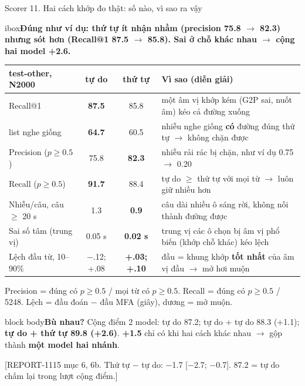 \documentclass[aspectratio=169,xcolor=table]{beamer}
\newcommand{\good}[1]{\textcolor{GoodGreen}{\textbf{#1}}}
\newcommand{\src}[1]{\par\vfill{\tiny\color{TextGray}[#1]}}
\newcommand{\ra}{$\rightarrow$}
\newcommand{\nbox}[2][block body]{\begin{beamercolorbox}[sep=0.45em,rounded=true]{#1}\footnotesize #2\end{beamercolorbox}}
\newcommand{\nb}[1]{\textcolor{Accent}{#1}}
\newcommand{\insight}[1]{\begin{beamercolorbox}[sep=0.55em,rounded=true]{ibox}\small\bfseries #1\end{beamercolorbox}\vspace{0.15cm}}
\begin{document}
\begin{frame}{Scorer 11. Hai cách khớp đo thật: số nào, vì sao ra vậy}
\insight{Đúng như ví dụ: thứ tự \nb{ít nhận nhầm} (precision 75.8 \ra{} 82.3) nhưng \nb{sót hơn} (Recall@1 87.5 \ra{} 85.8). Sai ở chỗ khác nhau \ra{} cộng hai model \nb{+2.6}.}
\renewcommand{\arraystretch}{1.0}\scriptsize\setlength{\tabcolsep}{3pt}
\begin{tabular}{L{2.9cm}ccL{8.4cm}}
\toprule
test-other, N2000 & tự do & thứ tự & Vì sao (diễn giải) \\
\midrule
Recall@1 & \good{87.5} & 85.8 & một âm vị khớp kém (G2P sai, nuốt âm) kéo cả đường xuống \\
\quad list nghe giống & \good{64.7} & 60.5 & nhiễu nghe giống \textbf{có} đường đúng thứ tự \ra{} không chặn được \\
Precision ($p \geq 0.5$) & 75.8 & \good{82.3} & nhiễu rải rác bị chặn, như ví dụ 0.75 \ra{} 0.20 \\
Recall ($p \geq 0.5$) & \good{91.7} & 88.4 & tự do $\geq$ thứ tự với mọi từ \ra{} luôn giữ nhiều hơn \\
Nhiễu/câu, câu $\geq$ 20 s & 1.3 & \good{0.9} & câu dài nhiều ô sáng rời, không nối thành đường được \\
\midrule
Sai số tâm (trung vị) & 0.05 s & \good{0.02 s} & trung vị các ô chọn bị âm vị phổ biến (khớp chỗ khác) kéo lệch \\
Lệch đầu từ, 10--90\% & $-$.12; +.08 & \good{+.03; +.10} & đầu = khung khớp \textbf{tốt nhất} của âm vị đầu \ra{} mở hơi muộn \\
\bottomrule
\end{tabular}
\par
{\tiny Precision = đúng có $p\ge0.5$ / mọi từ có $p\ge0.5$. Recall = đúng có $p\ge0.5$ / 5248. Lệch = đầu đoán $-$ đầu MFA (giây), dương = mở muộn.\par}
\vspace{0.03cm}
\nbox{\scriptsize\textbf{Bù nhau?} Cộng điểm 2 model: tự do 87.2; tự do + tự do 88.3 (+1.1); \textbf{tự do + thứ tự 89.8 (+2.6)}. \textbf{+1.5} chỉ có khi hai cách khác nhau \ra{} gộp thành \textbf{một model hai nhánh}.}
\src{REPORT-1115 mục 6, 6b. Thứ tự $-$ tự do: $-$1.7 [$-$2.7; $-$0.7]. 87.2 = tự do chấm lại trong lượt cộng điểm.}
\end{frame}
\end{document}
